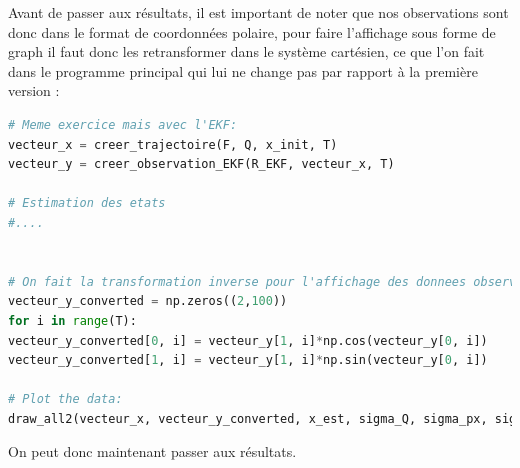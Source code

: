 Avant de passer aux résultats, il est important de noter que nos observations sont donc dans le format de coordonnées polaire, pour faire l'affichage sous forme de graph il faut donc les retransformer dans le système cartésien, ce que l'on fait dans le programme principal qui lui ne change pas par rapport à la première version :
\begin{lstlisting}[language=Python, caption=Filtre de Kalman Etendu]
# Meme exercice mais avec l'EKF:
vecteur_x = creer_trajectoire(F, Q, x_init, T)
vecteur_y = creer_observation_EKF(R_EKF, vecteur_x, T)

# Estimation des etats
#.... 


# On fait la transformation inverse pour l'affichage des donnees observees en cartesien:
vecteur_y_converted = np.zeros((2,100))
for i in range(T):
vecteur_y_converted[0, i] = vecteur_y[1, i]*np.cos(vecteur_y[0, i])
vecteur_y_converted[1, i] = vecteur_y[1, i]*np.sin(vecteur_y[0, i])

# Plot the data:
draw_all2(vecteur_x, vecteur_y_converted, x_est, sigma_Q, sigma_px, sigma_py, erreur_quad(x_est, vecteur_x))
\end{lstlisting}

On peut donc maintenant passer aux résultats.

